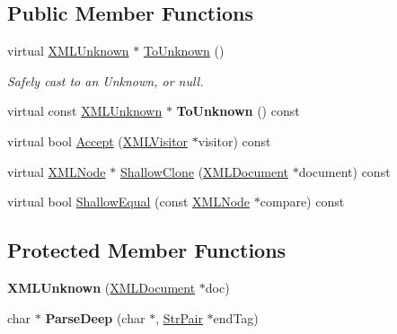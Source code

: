 \subsection*{Public Member Functions}
\begin{DoxyCompactItemize}
\item 
\hypertarget{classtinyxml2_1_1_x_m_l_unknown_af4374856421921cad578c8affae872b6}{}virtual \hyperlink{classtinyxml2_1_1_x_m_l_unknown}{X\+M\+L\+Unknown} $\ast$ \hyperlink{classtinyxml2_1_1_x_m_l_unknown_af4374856421921cad578c8affae872b6}{To\+Unknown} ()\label{classtinyxml2_1_1_x_m_l_unknown_af4374856421921cad578c8affae872b6}

\begin{DoxyCompactList}\small\item\em Safely cast to an Unknown, or null. \end{DoxyCompactList}\item 
\hypertarget{classtinyxml2_1_1_x_m_l_unknown_a257987e79955399e6e9f119b58d4bb30}{}virtual const \hyperlink{classtinyxml2_1_1_x_m_l_unknown}{X\+M\+L\+Unknown} $\ast$ {\bfseries To\+Unknown} () const \label{classtinyxml2_1_1_x_m_l_unknown_a257987e79955399e6e9f119b58d4bb30}

\item 
virtual bool \hyperlink{classtinyxml2_1_1_x_m_l_unknown_ac691f4efd84cad997b93c158e391e461}{Accept} (\hyperlink{classtinyxml2_1_1_x_m_l_visitor}{X\+M\+L\+Visitor} $\ast$visitor) const 
\item 
virtual \hyperlink{classtinyxml2_1_1_x_m_l_node}{X\+M\+L\+Node} $\ast$ \hyperlink{classtinyxml2_1_1_x_m_l_unknown_a85892945cf7f657375060db7518963c8}{Shallow\+Clone} (\hyperlink{classtinyxml2_1_1_x_m_l_document}{X\+M\+L\+Document} $\ast$document) const 
\item 
virtual bool \hyperlink{classtinyxml2_1_1_x_m_l_unknown_a9984ca7c35092be6f6f5d3dee47a9de7}{Shallow\+Equal} (const \hyperlink{classtinyxml2_1_1_x_m_l_node}{X\+M\+L\+Node} $\ast$compare) const 
\end{DoxyCompactItemize}
\subsection*{Protected Member Functions}
\begin{DoxyCompactItemize}
\item 
\hypertarget{classtinyxml2_1_1_x_m_l_unknown_a9391eb679598d50baba424e6f1aa367b}{}{\bfseries X\+M\+L\+Unknown} (\hyperlink{classtinyxml2_1_1_x_m_l_document}{X\+M\+L\+Document} $\ast$doc)\label{classtinyxml2_1_1_x_m_l_unknown_a9391eb679598d50baba424e6f1aa367b}

\item 
\hypertarget{classtinyxml2_1_1_x_m_l_unknown_aa2d7b6bce2e6299247f5b83873ff215d}{}char $\ast$ {\bfseries Parse\+Deep} (char $\ast$, \hyperlink{classtinyxml2_1_1_str_pair}{Str\+Pair} $\ast$end\+Tag)\label{classtinyxml2_1_1_x_m_l_unknown_aa2d7b6bce2e6299247f5b83873ff215d}

\end{DoxyCompactItemize}
